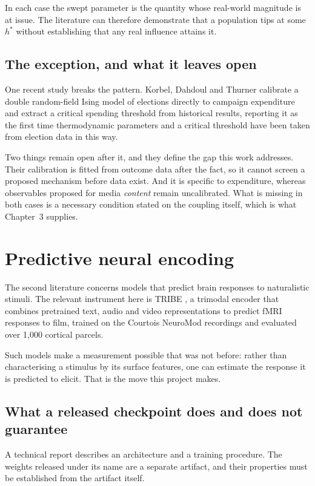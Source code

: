 In each case the swept parameter is the quantity whose real-world magnitude is at issue. The
literature can therefore demonstrate that a population tips at some $h^\ast$ without
establishing that any real influence attains it.

\subsection{The exception, and what it leaves open}

One recent study breaks the pattern. Korbel, Dahdoul and Thurner \cite{korbel2026} calibrate a
double random-field Ising model of elections directly to campaign expenditure and extract a
critical spending threshold from historical results, reporting it as the first time
thermodynamic parameters and a critical threshold have been taken from election data in this
way.

Two things remain open after it, and they define the gap this work addresses. Their
calibration is fitted from outcome data after the fact, so it cannot screen a proposed
mechanism before data exist. And it is specific to expenditure, whereas observables proposed
for media \emph{content} remain uncalibrated. What is missing in both cases is a necessary
condition stated on the coupling itself, which is what Chapter~3 supplies.

\section{Predictive neural encoding}

The second literature concerns models that predict brain responses to naturalistic stimuli.
The relevant instrument here is TRIBE \cite{tribe2025}, a trimodal encoder that combines
pretrained text, audio and video representations to predict fMRI responses to film, trained on
the Courtois NeuroMod recordings and evaluated over 1{,}000 cortical parcels.

Such models make a measurement possible that was not before: rather than characterising a
stimulus by its surface features, one can estimate the response it is predicted to elicit.
That is the move this project makes.

\subsection{What a released checkpoint does and does not guarantee}

A technical report describes an architecture and a training procedure. The weights released
under its name are a separate artifact, and their properties must be established from the
artifact itself.

